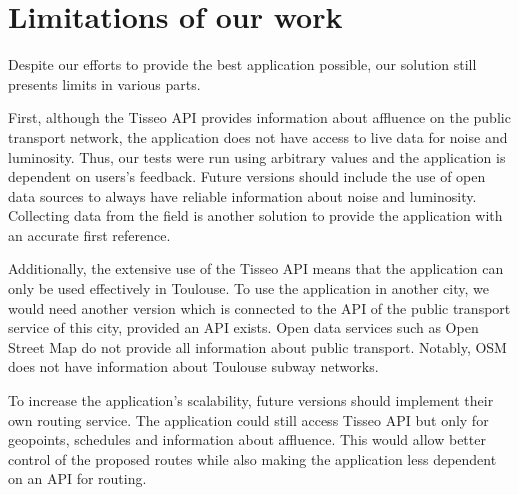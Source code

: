 \section{Limitations of our work}


Despite our efforts to provide the best application possible, our solution still presents limits in various parts.


First, although the Tisseo API provides information about affluence on the public transport network, the application does not have access to live data for noise and luminosity. Thus, our tests were run using arbitrary values and the application is dependent on users’s feedback. Future versions should include the use of open data sources to always have reliable information about noise and luminosity. Collecting data from the field is another solution to provide the application with an accurate first reference.


Additionally, the extensive use of the Tisseo API means that the application can only be used effectively in Toulouse. To use the application in another city, we would need another version which is connected to the API of the public transport service of this city, provided an API exists. Open data services such as Open Street Map do not provide all information about public transport. Notably, OSM does not have information about Toulouse subway networks.


To increase the application's scalability, future versions should implement their own routing service. The application could still access Tisseo API but only for geopoints, schedules and information about affluence. This would allow better control of the proposed routes while also making the application less dependent on an API for routing.
